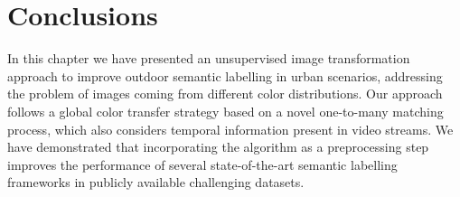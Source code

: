 \section{Conclusions}

In this chapter we have presented an unsupervised image transformation approach to improve outdoor semantic labelling in urban scenarios, addressing the problem of images coming from different color distributions. Our approach follows a global color transfer strategy based on a novel one-to-many matching process, which also considers temporal information present in video streams. We have demonstrated that incorporating the algorithm as a preprocessing step improves the performance of several state-of-the-art semantic labelling frameworks in publicly available challenging datasets. 